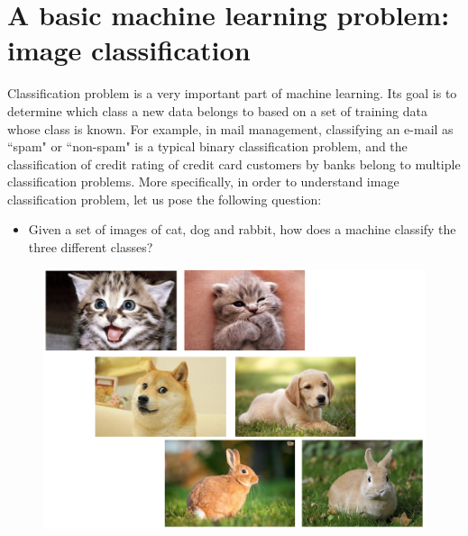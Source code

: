 \section{A basic machine learning problem: image classification}
Classification problem is a very important part of machine learning. Its goal is to determine which class a new data belongs to based on a set of training data whose class is known. For example, in mail management, classifying an e-mail as ``spam" or ``non-spam" is a typical binary classification problem, and the classification of credit rating of credit card customers by banks belong to multiple classification problems. More specifically, in order to understand image classification problem, let us pose the following question:


\begin{itemize}
	\item Given a set of images of cat, dog and rabbit, how does a machine classify the three different classes?
\end{itemize}

\begin{figure}[H]
	\begin{center}
		\includegraphics[width=.4\textwidth, height=.2\textheight]{figures/cat-dog-1.png}
	\end{center}
\end{figure}

\break

